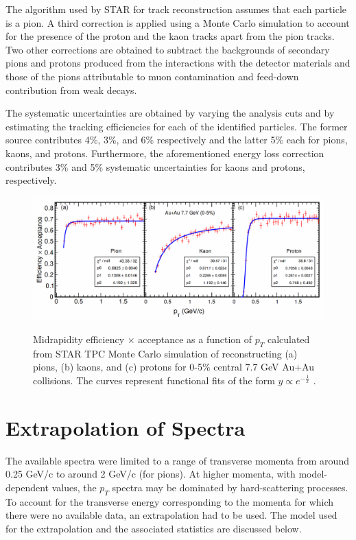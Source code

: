 The algorithm used by STAR for track reconstruction assumes that each particle is a pion. A third correction is applied using a Monte Carlo simulation to account for the presence of the proton and the kaon tracks apart from the pion tracks. Two other corrections are obtained to subtract the backgrounds of secondary pions and protons produced from the interactions with the detector materials and those of the pions attributable to muon contamination and feed-down contribution from weak decays.

The systematic uncertainties are obtained by varying the analysis cuts and by estimating the tracking efficiencies for each of the identified particles. The former source contributes 4\%, 3\%, and 6\% respectively and the latter 5\% each for pions, kaons, and protons. Furthermore, the aforementioned energy loss correction contributes 3\% and 5\% systematic uncertainties for kaons and protons, respectively.

\begin{figure}[h]
  \centering
  \includegraphics[width=6.5in]{../figures/Adamzyck_correction1.png}\\
  \caption{Midrapidity efficiency $\times$ acceptance as a function of $p_{T}$ calculated from STAR TPC Monte Carlo simulation of reconstructing (a) pions, (b) kaons, and (c) protons for 0-5\% central 7.7 GeV Au+Au collisions. The curves represent functional fits of the form $y \propto e^{-\frac{1}{x}}$ \cite{PhysRevC.96.044904}.}\label{fig:AdamczykCorrection1}
\end{figure}

\section{Extrapolation of Spectra}
The available spectra were limited to a range of transverse momenta from around 0.25 GeV/c to around 2 GeV/c (for pions). At higher momenta, with model-dependent values, the $p_{T}$ spectra may be dominated by hard-scattering processes. To account for the transverse energy corresponding to the momenta for which there were no available data, an extrapolation had to be used. The model used for the extrapolation and the associated statistics are discussed below.

